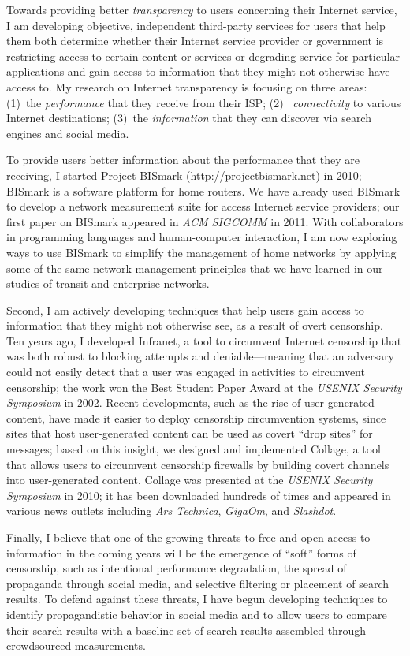 Towards providing better {\em transparency} to users concerning their
Internet service, I am developing objective, independent third-party
services for users that help them both determine whether their Internet
service provider or government is restricting access to certain content
or services or degrading service for particular applications and gain
access to information that they might not otherwise have access to.  My
research on Internet transparency is focusing on three areas: (1)~the
{\em performance} that they receive from their ISP; (2)~{\em
connectivity} to various Internet destinations; (3)~the {\em
information} that they can discover via search engines and social media.

To provide users better information about the performance that they are
receiving, I started Project BISmark (\url{http://projectbismark.net})
in 2010; BISmark is a software platform for home routers.  We have
already used BISmark to develop a network measurement suite for access
Internet service providers; our first paper on BISmark appeared in {\em
ACM SIGCOMM} in 2011.  With collaborators in programming languages and
human-computer interaction, I am now exploring ways to use BISmark to
simplify the management of home networks by applying some of the same
network management principles that we have learned in our studies of
transit and enterprise networks.

Second, I am actively developing techniques that help users gain access
to information that they might not otherwise see, as a result of
overt censorship.  Ten years ago, I developed Infranet, a tool to
circumvent Internet censorship that was both robust to blocking attempts
and deniable---meaning that an adversary could not easily detect that a
user was engaged in activities to circumvent censorship; the work won
the Best Student Paper Award at the {\em USENIX Security Symposium} in
2002.  Recent developments, such as the rise of user-generated content,
have made it easier to deploy censorship circumvention systems, since
sites that host user-generated content can be used as covert ``drop
sites'' for messages; based on this insight, we designed and implemented
Collage, a tool that allows users to circumvent censorship firewalls by
building covert channels into user-generated content.  Collage was
presented at the {\em USENIX Security Symposium} in 2010; it has been
downloaded hundreds of times and appeared in various news outlets
including {\em Ars Technica}, {\em GigaOm}, and {\em Slashdot}.

Finally, I believe that one of the growing threats to free and open
access to information in the coming years will be the emergence of
``soft'' forms of censorship, such as intentional performance
degradation, the spread of propaganda through social media, and 
selective filtering or placement of search results.  To defend against
these threats, I have begun developing techniques to identify propagandistic
behavior in social media and to allow users to compare their search
results with a baseline set of search results assembled through
crowdsourced measurements.  

